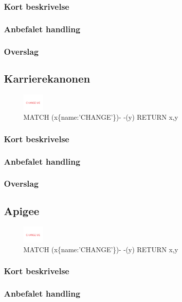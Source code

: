 \documentclass{article}
\begin{document}
\subsubsection{Kort beskrivelse}
\subsubsection{Anbefalet handling}
\subsubsection{Overslag}


\subsection{Karrierekanonen}
\begin{figure}[h]
\includegraphics[width=30pt]{CHANGE.PNG}
\caption{MATCH (x\{name:'CHANGE'\})- -(y) RETURN x,y}
\end{figure}
\subsubsection{Kort beskrivelse}
\subsubsection{Anbefalet handling}
\subsubsection{Overslag}


\subsection{Apigee}
\begin{figure}[h]
\includegraphics[width=30pt]{CHANGE.PNG}
\caption{MATCH (x\{name:'CHANGE'\})- -(y) RETURN x,y}
\end{figure}
\subsubsection{Kort beskrivelse}
\subsubsection{Anbefalet handling}
\end{document}
